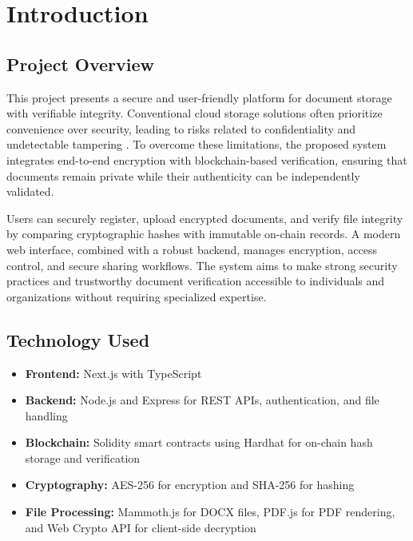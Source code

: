 \documentclass[12pt]{article}
\begin{document}
\tableofcontents
\newpage
\listoffigures
\newpage


\newpage
\section{Introduction}

\subsection{Project Overview}

This project presents a secure and user-friendly platform for document storage with verifiable integrity. Conventional cloud storage solutions often prioritize convenience over security, leading to risks related to confidentiality and undetectable tampering \cite{stallings2017}. To overcome these limitations, the proposed system integrates end-to-end encryption with blockchain-based verification, ensuring that documents remain private while their authenticity can be independently validated.

Users can securely register, upload encrypted documents, and verify file integrity by comparing cryptographic hashes with immutable on-chain records. A modern web interface, combined with a robust backend, manages encryption, access control, and secure sharing workflows. The system aims to make strong security practices and trustworthy document verification accessible to individuals and organizations without requiring specialized expertise.

\subsection{Technology Used}

\begin{itemize}
\item \textbf{Frontend:} Next.js with TypeScript
\item \textbf{Backend:} Node.js and Express for REST APIs, authentication, and file handling
\item \textbf{Blockchain:} Solidity smart contracts using Hardhat for on-chain hash storage and verification
\item \textbf{Cryptography:} AES-256 for encryption and SHA-256 for hashing \cite{nist197}
\item \textbf{File Processing:} Mammoth.js for DOCX files, PDF.js for PDF rendering, and Web Crypto API for client-side decryption
\end{itemize}
\end{document}
